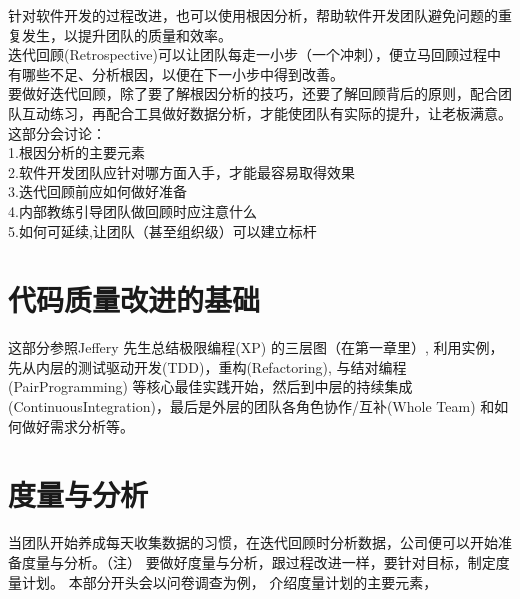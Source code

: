 \documentclass{book}        %
\begin{document}
针对软件开发的过程改进，也可以使用根因分析，帮助软件开发团队避免问题的重复发生，以提升团队的质量和效率。\\

迭代回顾(Retrospective)可以让团队每走一小步（一个冲刺），便立马回顾过程中有哪些不足、分析根因，以便在下一小步中得到改善。\\

要做好迭代回顾，除了要了解根因分析的技巧，还要了解回顾背后的原则，配合团队互动练习，再配合工具做好数据分析，才能使团队有实际的提升，让老板满意。\\

这部分会讨论： \\

1.根因分析的主要元素\\
2.软件开发团队应针对哪方面入手，才能最容易取得效果\\
3.迭代回顾前应如何做好准备\\
4.内部教练引导团队做回顾时应注意什么\\
5.如何可延续,让团队（甚至组织级）可以建立标杆\\





\part{代码质量改进的基础}这部分参照Jeffery 先生总结极限编程(XP) 的三层图（在第一章里）, 利用实例，先从内层的测试驱动开发(TDD)，重构(Refactoring), 与结对编程(PairProgramming) 等核心最佳实践开始，然后到中层的持续集成(ContinuousIntegration)，最后是外层的团队各角色协作/互补(Whole Team) 和如何做好需求分析等。















\part{度量与分析}当团队开始养成每天收集数据的习惯，在迭代回顾时分析数据，公司便可以开始准备度量与分析。（注） 要做好度量与分析，跟过程改进一样，要针对目标，制定度量计划。 本部分开头会以问卷调查为例， 介绍度量计划的主要元素，
\end{document}
